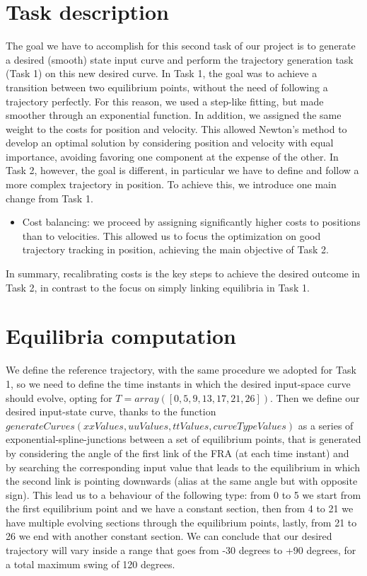 \documentclass[a4paper,11pt,oneside]{book}
\begin{document}
\section{Task description}
\begin{justify}
    {The goal we have to accomplish for this second task of our project is to generate a desired (smooth) state input curve and perform the trajectory generation task (Task 1) on this new desired curve. In Task 1, the goal was to achieve a transition between two equilibrium points, without the need of following a trajectory perfectly. For this reason, we used a step-like fitting, but made smoother through an exponential function. In addition, we assigned the same weight to the costs for position and velocity. This allowed Newton's method to develop an optimal solution by considering position and velocity with equal importance, avoiding favoring one component at the expense of the other.
    In Task 2, however, the goal is different, in particular we have to define and follow a more complex trajectory in position. To achieve this, we introduce one main change from Task 1.
    \begin{itemize}
        \item Cost balancing: we proceed by assigning significantly higher costs to positions than to velocities. This allowed us to focus the optimization on good trajectory tracking in position, achieving the main objective of Task 2.
    \end{itemize}
    In summary, recalibrating costs is the key steps to achieve the desired outcome in Task 2, in contrast to the focus on simply linking equilibria in Task 1.}
\end{justify}
\section{Equilibria computation}
\begin{justify}
    {We define the reference trajectory, with the same procedure we adopted for Task 1, so we need to define  the time instants in which the desired input-space curve should evolve, opting for $T = array([0, 5, 9, 13, 17, 21, 26])$. Then we define our desired input-state curve, thanks to the function $generateCurves(xxValues, uuValues, ttValues, curveTypeValues)$ as a series of exponential-spline-junctions between a set of equilibrium points, that is generated by considering the angle of the first link of the FRA (at each time instant) and by searching the corresponding input value that leads to the equilibrium in which the second link is pointing downwards (alias at the same angle but with opposite sign). This lead us to a behaviour of the following type: from 0 to 5 we start from the first equilibrium point and we have a constant section, then from 4 to 21 we have multiple evolving sections through the equilibrium points, lastly, from 21 to 26 we end with another constant section. We can conclude that our desired trajectory will vary inside a range that goes from -30 degrees to +90 degrees, for a total maximum swing of 120 degrees.}
\end{justify}
\end{document}
